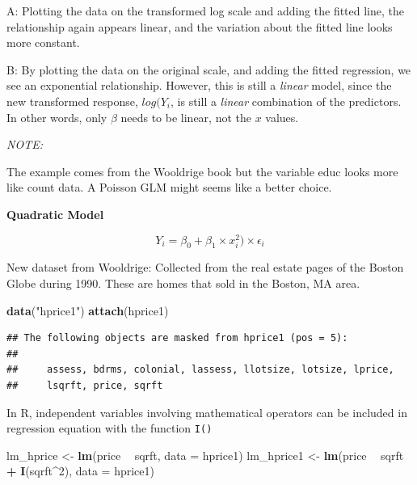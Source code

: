 \documentclass[]{book}
\newenvironment{Shaded}{\begin{snugshade}}{\end{snugshade}}
\newcommand{\DataTypeTok}[1]{\textcolor[rgb]{0.13,0.29,0.53}{#1}}
\newcommand{\DecValTok}[1]{\textcolor[rgb]{0.00,0.00,0.81}{#1}}
\newcommand{\KeywordTok}[1]{\textcolor[rgb]{0.13,0.29,0.53}{\textbf{#1}}}
\newcommand{\NormalTok}[1]{#1}
\newcommand{\OperatorTok}[1]{\textcolor[rgb]{0.81,0.36,0.00}{\textbf{#1}}}
\newcommand{\StringTok}[1]{\textcolor[rgb]{0.31,0.60,0.02}{#1}}
\begin{document}
A: Plotting the data on the transformed log scale and adding the fitted
line, the relationship again appears linear, and the variation about the
fitted line looks more constant.

B: By plotting the data on the original scale, and adding the fitted
regression, we see an exponential relationship. However, this is still a
\emph{linear} model, since the new transformed response, \(log(Y_{i}\),
is still a \emph{linear} combination of the predictors. In other words,
only \(\beta\) needs to be linear, not the \(x\) values.

\emph{NOTE:}

The example comes from the Wooldrige book but the variable educ looks
more like count data. A Poisson GLM might seems like a better choice.

\textbf{Quadratic Model}

\begin{equation}
Y_{i} = \beta_{0} + \beta_{1} \times x^2_{i})  \times \epsilon_{i}
\end{equation}

New dataset from Wooldrige: Collected from the real estate pages of the
Boston Globe during 1990. These are homes that sold in the Boston, MA
area.

\begin{Shaded}
\begin{Highlighting}[]
\KeywordTok{data}\NormalTok{(}\StringTok{"hprice1"}\NormalTok{)}
\KeywordTok{attach}\NormalTok{(hprice1)}
\end{Highlighting}
\end{Shaded}

\begin{verbatim}
## The following objects are masked from hprice1 (pos = 5):
## 
##     assess, bdrms, colonial, lassess, llotsize, lotsize, lprice,
##     lsqrft, price, sqrft
\end{verbatim}

In R, independent variables involving mathematical operators can be
included in regression equation with the function \texttt{I()}

\begin{Shaded}
\begin{Highlighting}[]
\NormalTok{lm_hprice <-}\StringTok{ }\KeywordTok{lm}\NormalTok{(price }\OperatorTok{~}\StringTok{ }\NormalTok{sqrft, }\DataTypeTok{data  =}\NormalTok{ hprice1)}
\NormalTok{lm_hprice1 <-}\StringTok{ }\KeywordTok{lm}\NormalTok{(price }\OperatorTok{~}\StringTok{ }\NormalTok{sqrft }\OperatorTok{+}\StringTok{ }\KeywordTok{I}\NormalTok{(sqrft}\OperatorTok{^}\DecValTok{2}\NormalTok{), }\DataTypeTok{data  =}\NormalTok{ hprice1)}
\end{Highlighting}
\end{Shaded}
\end{document}
